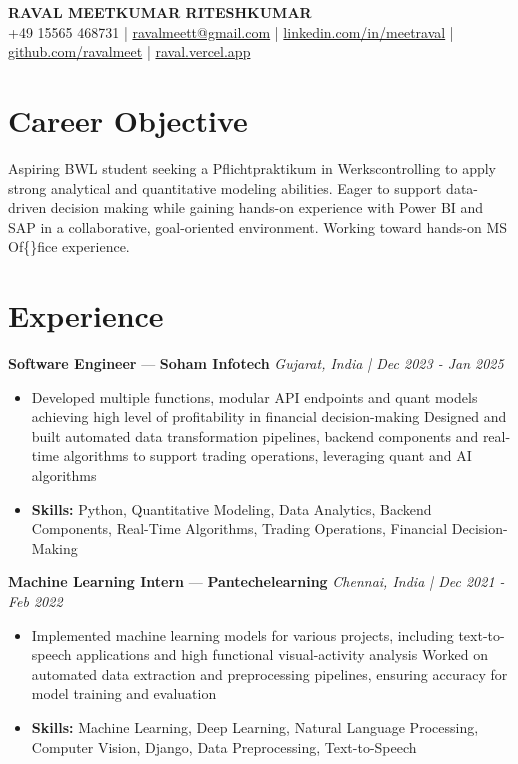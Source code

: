 \documentclass[a4paper,10pt]{article}
\begin{document}
\begin{center}
  {\Large\bfseries RAVAL MEETKUMAR RITESHKUMAR}\\[2pt]
  {\small +49 15565 468731 \;|\; \href{mailto:ravalmeett@gmail.com}{ravalmeett@gmail.com} \;|\; \href{https://www.linkedin.com/in/meetraval/}{linkedin.com/in/meetraval} \;|\; \href{https://github.com/ravalmeet}{github.com/ravalmeet} \;|\; \href{https://raval.vercel.app/}{raval.vercel.app}}
\end{center}
\vspace{-3pt}

\section*{Career Objective}
Aspiring BWL student seeking a Pflichtpraktikum in Werkscontrolling to apply strong analytical and quantitative modeling abilities. Eager to support data-driven decision making while gaining hands-on experience with Power BI and SAP in a collaborative, goal-oriented environment. Working toward hands-on MS Of\{\}fice experience.\par

\section*{Experience}
\textbf{Software Engineer} — \textbf{Soham Infotech} \hfill \textit{Gujarat, India \;|\; Dec 2023 - Jan 2025}\par
\vspace{1pt}
\begin{itemize}
  \item Developed multiple functions, modular API endpoints and quant models achieving high level of profitability in financial decision-making Designed and built automated data transformation pipelines, backend components and real-time algorithms to support trading operations, leveraging quant and AI algorithms
  \item \textbf{Skills:} Python, Quantitative Modeling, Data Analytics, Backend Components, Real-Time Algorithms, Trading Operations, Financial Decision-Making
\end{itemize}
\vspace{3pt}
\textbf{Machine Learning Intern} — \textbf{Pantechelearning} \hfill \textit{Chennai, India \;|\; Dec 2021 - Feb 2022}\par
\vspace{1pt}
\begin{itemize}
  \item Implemented machine learning models for various projects, including text-to-speech applications and high functional visual-activity analysis Worked on automated data extraction and preprocessing pipelines, ensuring accuracy for model training and evaluation
  \item \textbf{Skills:} Machine Learning, Deep Learning, Natural Language Processing, Computer Vision, Django, Data Preprocessing, Text-to-Speech
\end{itemize}
\end{document}
